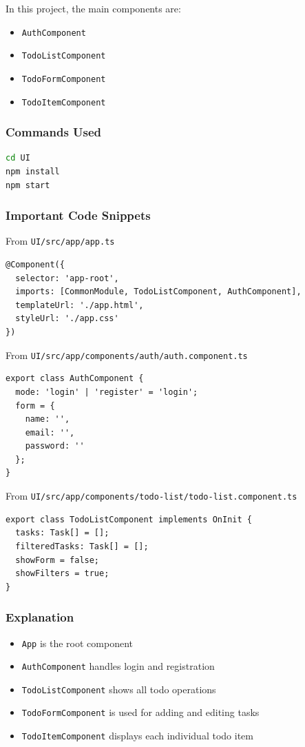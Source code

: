 \documentclass[12pt,a4paper]{article}
\begin{document}
In this project, the main components are:
\begin{itemize}
  \item \texttt{AuthComponent}
  \item \texttt{TodoListComponent}
  \item \texttt{TodoFormComponent}
  \item \texttt{TodoItemComponent}
\end{itemize}

\subsubsection*{Commands Used}
\begin{lstlisting}[style=projectcode,language=bash]
cd UI
npm install
npm start
\end{lstlisting}

\subsubsection*{Important Code Snippets}
From \texttt{UI/src/app/app.ts}
\begin{lstlisting}[style=projectcode]
@Component({
  selector: 'app-root',
  imports: [CommonModule, TodoListComponent, AuthComponent],
  templateUrl: './app.html',
  styleUrl: './app.css'
})
\end{lstlisting}

From \texttt{UI/src/app/components/auth/auth.component.ts}
\begin{lstlisting}[style=projectcode]
export class AuthComponent {
  mode: 'login' | 'register' = 'login';
  form = {
    name: '',
    email: '',
    password: ''
  };
}
\end{lstlisting}

From \texttt{UI/src/app/components/todo-list/todo-list.component.ts}
\begin{lstlisting}[style=projectcode]
export class TodoListComponent implements OnInit {
  tasks: Task[] = [];
  filteredTasks: Task[] = [];
  showForm = false;
  showFilters = true;
}
\end{lstlisting}

\subsubsection*{Explanation}
\begin{itemize}
  \item \texttt{App} is the root component
  \item \texttt{AuthComponent} handles login and registration
  \item \texttt{TodoListComponent} shows all todo operations
  \item \texttt{TodoFormComponent} is used for adding and editing tasks
  \item \texttt{TodoItemComponent} displays each individual todo item
\end{itemize}
\end{document}
